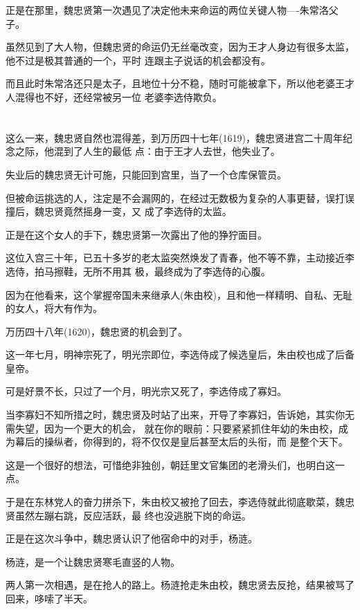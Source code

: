 \documentclass[11pt,a4paper,onecolumn]{article}
\begin{document}
正是在那里，魏忠贤第一次遇见了决定他未来命运的两位关键人物----朱常洛父子。

虽然见到了大人物，但魏忠贤的命运仍无丝毫改变，因为王才人身边有很多太监，他不过是极其普通的一个，平时
连跟主子说话的机会都没有。

而且此时朱常洛还只是太子，且地位十分不稳，随时可能被拿下，所以他老婆王才人混得也不好，还经常被另一位
老婆李选侍欺负。

\section[\thesection]{}

这么一来，魏忠贤自然也混得差，到万历四十七年(1619)，魏忠贤进宫二十周年纪念之际，他混到了人生的最低
点：由于王才人去世，他失业了。

失业后的魏忠贤无计可施，只能回到宫里，当了一个仓库保管员。

但被命运挑选的人，注定是不会漏网的，在经过无数极为复杂的人事更替，误打误撞后，魏忠贤竟然摇身一变，又
成了李选侍的太监。

正是在这个女人的手下，魏忠贤第一次露出了他的狰狞面目。

这位入宫三十年，已五十多岁的老太监突然焕发了青春，他不等不靠，主动接近李选侍，拍马擦鞋，无所不用其
极，最终成为了李选侍的心腹。

因为在他看来，这个掌握帝国未来继承人(朱由校)，且和他一样精明、自私、无耻的女人，将大有作为。

万历四十八年(1620)，魏忠贤的机会到了。

这一年七月，明神宗死了，明光宗即位，李选侍成了候选皇后，朱由校也成了后备皇帝。

可是好景不长，只过了一个月，明光宗又死了，李选侍成了寡妇。

当李寡妇不知所措之时，魏忠贤及时站了出来，开导了李寡妇，告诉她，其实你无需失望，因为一个更大的机会，
就在你的眼前：只要紧紧抓住年幼的朱由校，成为幕后的操纵者，你得到的，将不仅仅是皇后甚至太后的头衔，而
是整个天下。

这是一个很好的想法，可惜绝非独创，朝廷里文官集团的老滑头们，也明白这一点。

于是在东林党人的奋力拼杀下，朱由校又被抢了回去，李选侍就此彻底歇菜，魏忠贤虽然左蹦右跳，反应活跃，最
终也没逃脱下岗的命运。

正是在这次斗争中，魏忠贤认识了他宿命中的对手，杨涟。

杨涟，是一个让魏忠贤寒毛直竖的人物。

两人第一次相遇，是在抢人的路上。杨涟抢走朱由校，魏忠贤去反抢，结果被骂了回来，哆嗦了半天。
\end{document}

